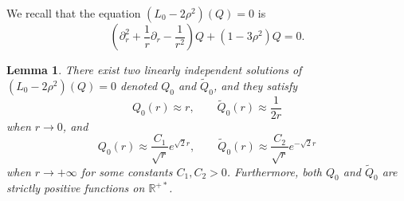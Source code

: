 \documentclass[11 pt]{amsart}
\newtheorem{lem}{Lemma}[section]
\theoremstyle{definition}
\theoremstyle{remark}
\numberwithin{equation}{section}
\begin{document}
We recall that the equation $(L_0 - 2 \rho^2) (Q) = 0$ is
\[ \left( \partial_r^2 + \frac{1}{r} \partial_r - \frac{1}{r^2} \right) Q + (1
   - 3 \rho^2) Q = 0. \]
\begin{lem}
  \label{lethargy}There exist two linearly independent solutions of $(L_0 - 2
  \rho^2) (Q) = 0$ denoted $Q_0$ and $\widetilde{Q}_0$, and they satisfy
  \[ Q_0 (r) \approx r,\qquad \widetilde{Q}_0 (r) \approx \frac{1}{2 r} \]
  when $r \rightarrow 0$, and
  \[ Q_0 (r) \approx \frac{C_1}{\sqrt{r}} e^{\sqrt{2} r},\qquad \widetilde{Q}_0 (r)
     \approx \frac{C_2}{\sqrt{r}} e^{- \sqrt{2} r} \]
  \[ \  \]
  when $r \rightarrow + \infty$ for some constants $C_1, C_2 > 0$.
  Furthermore, both $Q_0$ and $\widetilde{Q}_0$ are strictly positive functions on
  $\mathbb{R}^{+ \ast}$.
\end{lem}
\end{document}
